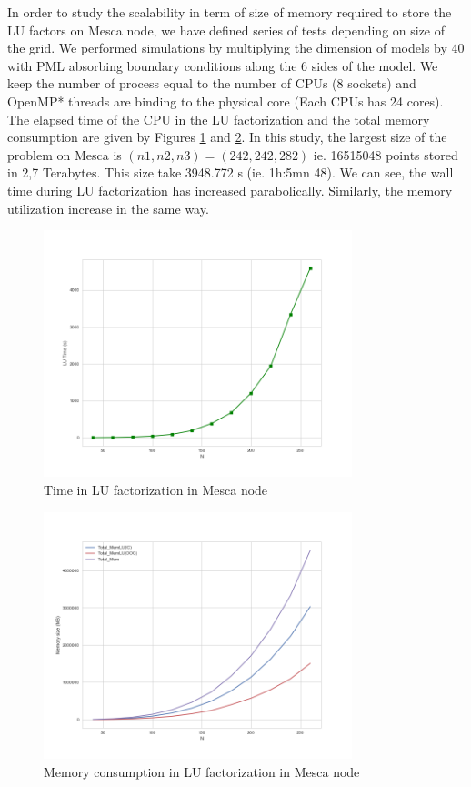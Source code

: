 In order to study the scalability in term of size of memory required to store the LU factors on Mesca node, we have defined series of tests depending on size of the grid. We performed simulations by multiplying the dimension of models by 40 with PML
absorbing boundary conditions along the 6 sides of the model. We keep the number of process equal to the number of CPUs (8 sockets) and OpenMP* threads are binding to the physical core (Each CPUs has 24 cores). The elapsed time of the CPU in the LU factorization and the total memory consumption are given by Figures \ref{MescaTime} and \ref{MescaMemory}. In this study, the largest size of the problem on Mesca is $(n1,n2,n3)=( 242,242,282 )$ ie. 16515048 points stored in 2,7 Terabytes. This size take 3948.772 s (ie. 1h:5mn 48). We can see, the wall time during LU factorization has increased parabolically. Similarly, the memory utilization increase in the same way.  
  
\begin{figure}[!h]
\centering 
\includegraphics[width=0.8\textwidth]{images/MescaTime.png}
\caption{Time in LU factorization in Mesca node}
\label{MescaTime} 
\end{figure}
\begin{figure}[!h]
\centering 
\includegraphics[width=0.8\textwidth]{images/MescaMemory.png}
\caption{Memory consumption in LU factorization in Mesca node}
\label{MescaMemory} 
\end{figure}

